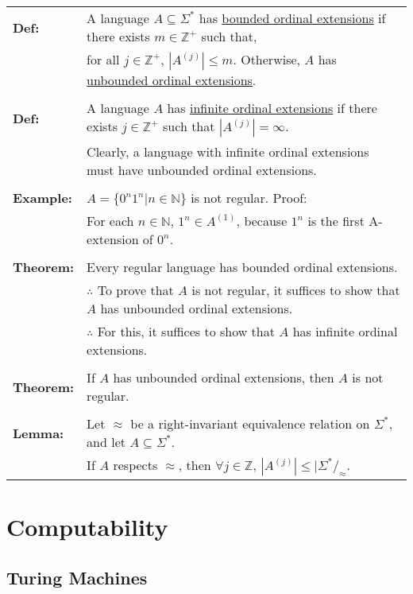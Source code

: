 \documentclass[11pt]{article}
\begin{document}
\begin{tabular}{ll}
{\bf Def:} & A language $A\subseteq\Sigma^*$ has \underline{bounded ordinal extensions} if there exists $m\in\mathbb{Z}^+$ such that, \\
& for all $j\in\mathbb{Z}^+$, $|A^{(j)}|\leqslant m$. Otherwise, $A$ has \underline{unbounded ordinal extensions}. \\
\\
{\bf Def:} & A language $A$ has \underline{infinite ordinal extensions} if there exists $j\in\mathbb{Z}^+$ such that $|A^{(j)}|=\infty$. \\
& Clearly, a language with infinite ordinal extensions must have unbounded ordinal extensions. \\
\\
{\bf Example:} & $A=\{0^n1^n|n\in\mathbb{N}\}$ is not regular. Proof:\\
& For each $n\in\mathbb{N}$, $1^n\in A^{(1)}$, because $1^n$ is the first A-extension of $0^n$.\\
\\
{\bf Theorem:} & Every regular language has bounded ordinal extensions. \\
& $\therefore$ To prove that $A$ is not regular, it suffices to show that $A$ has unbounded ordinal extensions. \\
& $\therefore$ For this, it suffices to show that $A$ has infinite ordinal extensions. \\
\\
{\bf Theorem:} & If $A$ has unbounded ordinal extensions, then $A$ is not regular. \\
\\
{\bf Lemma:} & Let $\approx$ be a right-invariant equivalence relation on $\Sigma^*$, and let $A\subseteq\Sigma^*$. \\
& If $A$ respects $\approx$, then $\forall j \in\mathbb{Z}$, $|A^{(j)}| \leqslant |\Sigma^*/_\approx$. 
\end{tabular}

\section{Computability}

\subsection{Turing Machines}
\end{document}
